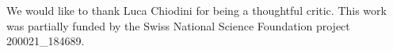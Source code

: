 \documentclass[acmsmall,screen,nonacm]{acmart}
\begin{document}
\begin{acks}
We would like to thank Luca Chiodini for being a thoughtful critic.
This work was partially funded by the Swiss National Science Foundation project 200021\_184689.
\end{acks}




\newpage

\appendix


\end{document}
